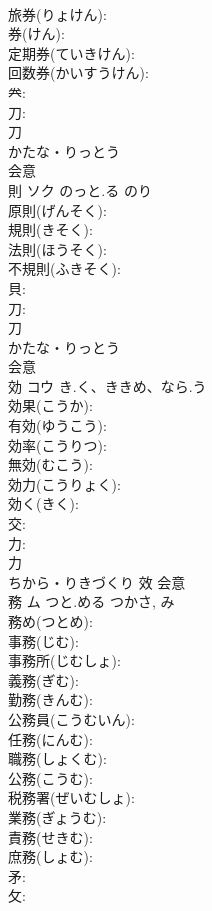 \documentclass[8pt]{extreport}
\begin{document}
\begin{CJK}{UTF8}{min}
\\	旅券(りょけん): 
\\	券(けん): 
\\	定期券(ていきけん): 
\\	回数券(かいすうけん): 
\\	𠔉: 
\\	刀: 
\\	刀	
\\	かたな・りっとう	
\\	会意 
\\	則	ソク	のっと.る	のり	
\\	原則(げんそく): 
\\	規則(きそく): 
\\	法則(ほうそく): 
\\	不規則(ふきそく): 
\\	貝: 
\\	刀: 
\\	刀	
\\	かたな・りっとう	
\\	会意 
\\	効	コウ	き.く、ききめ、なら.う		
\\	効果(こうか): 
\\	有効(ゆうこう): 
\\	効率(こうりつ): 
\\	無効(むこう): 
\\	効力(こうりょく): 
\\	効く(きく): 
\\	交: 
\\	力: 
\\	力	
\\	ちから・りきづくり	效	会意 
\\	務	ム	つと.める	つかさ, み	
\\	務め(つとめ): 
\\	事務(じむ): 
\\	事務所(じむしょ): 
\\	義務(ぎむ): 
\\	勤務(きんむ): 
\\	公務員(こうむいん): 
\\	任務(にんむ): 
\\	職務(しょくむ): 
\\	公務(こうむ): 
\\	税務署(ぜいむしょ): 
\\	業務(ぎょうむ): 
\\	責務(せきむ): 
\\	庶務(しょむ): 
\\	矛: 
\\	攵: 

\end{CJK}
\end{document}
